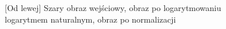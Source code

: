 \documentclass[a4paper,12pt, titlepage]{report}
\begin{document}
\begin{figure}[h]
    \centering
    \caption{[Od lewej] Szary obraz wejściowy, obraz po logarytmowaniu logarytmem naturalnym, obraz po normalizacji}%
    \label{fig:geo_after_grey1}%
\end{figure}
\FloatBarrier
\end{document}
